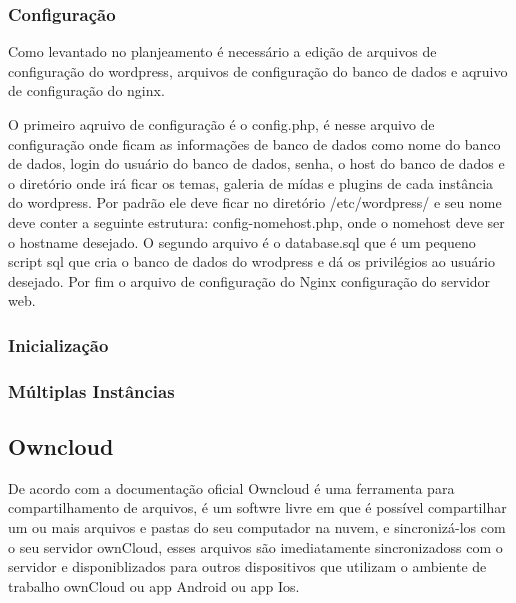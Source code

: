 
\subsubsection{Configuração}

Como levantado no planjeamento é necessário a edição de arquivos de configuração
do wordpress, arquivos de configuração do banco de dados e aqruivo de configuração
do nginx.

O primeiro aqruivo de configuração é o config.php, é nesse arquivo de
configuração onde ficam as informações de banco de dados como nome do banco de dados,
login do usuário do banco de dados, senha, o host do banco de dados e o diretório
onde irá ficar os temas, galeria de mídas e plugins de cada instância do wordpress.
Por padrão ele deve ficar no diretório /etc/wordpress/ e seu nome deve conter
a seguinte estrutura: config-nomehost.php, onde o nomehost deve ser o hostname
desejado. O segundo arquivo é o database.sql que é um pequeno script sql que
cria o banco de dados do wrodpress e dá os privilégios ao usuário desejado. Por fim
o arquivo de configuração do Nginx configuração do servidor web.

\subsubsection{Inicialização}


\subsubsection{Múltiplas Instâncias}

\subsection{Owncloud}
\label{sub:owncloud}

De acordo com a documentação oficial\cite{owncloud} Owncloud é uma ferramenta
para compartilhamento de arquivos, é um softwre livre em que é possível compartilhar
um ou mais arquivos e pastas do seu computador na nuvem, e sincronizá-los com o seu
servidor ownCloud, esses arquivos são imediatamente sincronizadoss com o servidor
e disponiblizados para outros dispositivos que utilizam o ambiente de trabalho
ownCloud ou app Android ou app Ios.

